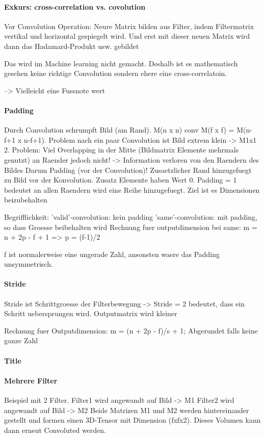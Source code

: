 \documentclass[../main]{subfiles}
\begin{document}
\paragraph{Exkurs: cross-correlation vs. covolution}
Vor Convolution Operation: Neure Matrix bilden aus Filter, indem Filtermatrix
vertikal und horizontal gespiegelt wird. Und erst mit dieser neuen Matrix wird
dann das Hadamard-Produkt usw. gebildet

Das wird im Machine learning nicht gemacht. Deshalb ist es mathematisch gesehen
keine richtige Convolution sondern ehere eine cross-correlatoin.

--> Vielleicht eine Fussnote wert

\paragraph{Padding}
Durch Convolution schrumpft Bild (am Rand). M(n x n) conv M(f x f) = M(n-f+1 x
n-f+1).
Problem nach ein paar Convolution ist Bild extrem klein -> M1x1
2. Problem: Viel Overlapping in der Mitte (Bildmatrix Elemente mehrmals genutzt)
an Raender jedoch nicht! -> Information verloren von den Raendern des Bildes
Darum Padding (vor der Convolution)! Zusaetzlicher Rand hinzugefuegt zu Bild vor
der Konvolution. Zusatz Elemente haben Wert 0. Padding = 1 bedeutet an allen
Raendern wird eine Reihe hinzugefuegt. Ziel ist es Dimensionen beizubehalten

Begrifflichkeit:
'valid'-convolution: kein padding
'same'-convolution: mit padding, so dass Groesse beibehalten wird
Rechnung fuer outputdimension bei same: m = n + 2p - f + 1 => p = (f-1)/2

f ist normalerweise eine ungerade Zahl, ansonsten waere das Padding unsymmetrisch.
\paragraph{Stride}
Stride ist Schrittgroesse der Filterbewegung
-> Stride = 2 bedeutet, dass ein Schritt uebersprungen wird.
Outputmatrix wird kleiner

Rechnung fuer Outputdimension:
m = (n + 2p - f)/s + 1; Abgerundet falls keine ganze Zahl
\paragraph{Title}

\paragraph{Mehrere Filter}
Beispiel mit 2 Filter.
Filter1 wird angewandt auf Bild -> M1
Filter2 wird angewandt auf Bild -> M2
Beide Matrizen M1 und M2 werden hintereinander gestellt und formen einen
3D-Tensor mit Dimension (fxfx2). Dieses Volumen kann dann erneut Convoluted werden.
\end{document}
